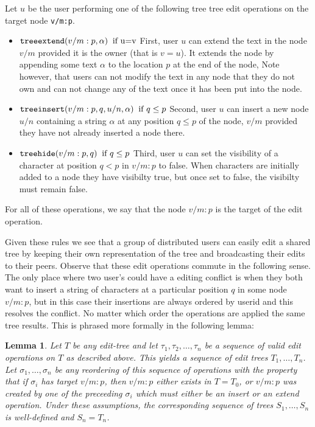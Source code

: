 \documentclass{amsart}
\newtheorem{lemma}[theorem]{Lemma}
\begin{document}
Let $u$ be the user performing one of the following tree tree edit operations
on the target node {\tt v/m:p}.
\begin{itemize}
\item ${\tt treeextend}(v/m:p,\alpha)\;\;\text{if u=v}$ \newline
First, user $u$ can extend the text in the node $v/m$
provided it is the owner (that is $v=u$). It extends the node by appending
some text $\alpha$ to the location $p$ at the end of the node,
Note however, that users can not modify
the text in any node that they do not own and can not change any of the text
once it has been put into the node.
\item ${\tt treeinsert}(v/m:p,q,u/n,\alpha) \;\; \text{if $q\le p$}$
\newline
Second, user $u$ can insert a new node $u/n$ containing a string $\alpha$
at any position $q\le p$ of the node, 
$v/m$ provided
they have not already inserted a node there.
\item ${\tt treehide}(v/m:p,q)  \;\; \text{if $q\le p$}$\newline
Third, user $u$ can set the visibility of a character at position $q < p$
in  $v/m:p$ to false.
When characters are initially added to a node they have visibilty true, but once
set to false, the visibilty must remain false. 
\end{itemize}
For all of these operations, we say that the node $v/m:p$ is the target of the edit operation.

Given these rules we see that a group of distributed users can easily edit a 
shared tree by keeping their own representation of the tree and broadcasting
their edits to their peers. Observe that these edit operations commute in
the following sense. The only place where two user's could have a editing
conflict is when they both want to insert a string of characters at a particular
position $q$ in some node $v/m:p$, but in this case their insertions are always
ordered by userid and this resolves the conflict. No matter which order the
operations are applied the same tree results. This is phrased more formally
in the following lemma:

\begin{lemma}
Let $T$ be any edit-tree and let $\tau_1,\tau_2,\ldots,\tau_n$
be a sequence of valid edit operations on $T$ as described above.
This yields a sequence of edit trees $T_1,\ldots,T_n$. Let 
$\sigma_1,\ldots,\sigma_n$ be any reordering of this sequence of operations
with the property that if $\sigma_i$ has target $v/m:p$, then $v/m:p$ either
exists in $T=T_0$, or $v/m:p$ was created by one of the preceeding $\sigma_i$
which must either be an insert or an extend operation.
Under these assumptions, the corresponding sequence of trees
$S_1,\ldots,S_n$ is well-defined and $S_n=T_n$.
\end{lemma}
\end{document}
